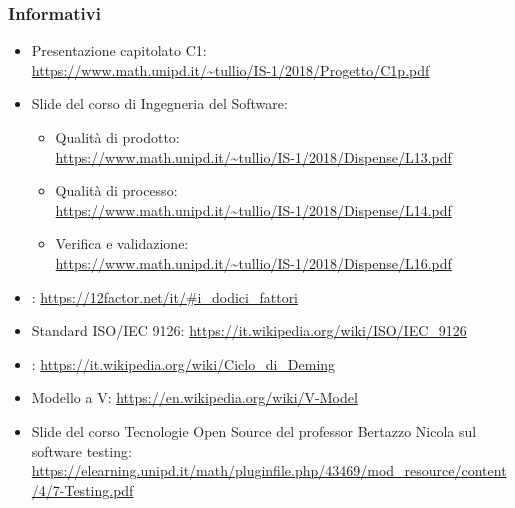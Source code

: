     \subsubsection{Informativi}\label{riferimenti informativi}
    \begin{itemize}
    	\item Presentazione capitolato C1:\\ \url{https://www.math.unipd.it/~tullio/IS-1/2018/Progetto/C1p.pdf}
    	\item Slide del corso di Ingegneria del Software:
    	
    	\begin{itemize}
    		\item Qualità di prodotto:\\ \url{https://www.math.unipd.it/~tullio/IS-1/2018/Dispense/L13.pdf}
    		\item Qualità di processo:\\ \url{https://www.math.unipd.it/~tullio/IS-1/2018/Dispense/L14.pdf}
    		\item Verifica e validazione:\\
    		\url{https://www.math.unipd.it/~tullio/IS-1/2018/Dispense/L16.pdf}
    	\end{itemize}
    	\item {}:
    	\url{https://12factor.net/it/#i_dodici_fattori}
    	\item Standard ISO/IEC 9126:
    	\url{https://it.wikipedia.org/wiki/ISO/IEC_9126}
    	\item {}:
    	\url{https://it.wikipedia.org/wiki/Ciclo_di_Deming}
    	\item Modello a V:
    	\url{https://en.wikipedia.org/wiki/V-Model}
    	\item Slide del corso Tecnologie Open Source del professor Bertazzo Nicola sul software testing:\\
    	\url{https://elearning.unipd.it/math/pluginfile.php/43469/mod_resource/content/4/7-Testing.pdf}
    \end{itemize}